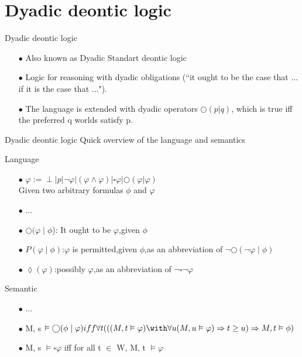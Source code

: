 \documentclass{beamer}
\begin{document}
\section{Dyadic deontic logic}
\begin{frame}{Dyadic deontic logic}
\begin{enumerate}
\item[$\bullet$]Also known as Dyadic Standart deontic logic
\item[$\bullet$]Logic for reasoning with dyadic obligations (“it ought to be the case that ... if it is the case that ...").
\item[$\bullet$]The language is extended with dyadic operators  $\bigcirc(p|q)$, which is true iff the preferred q worlds satisfy p.
\end{enumerate}
\end{frame}
\begin{frame}{Dyadic deontic logic}
Quick overview of the language and semantics
\begin{block}{Language}
\begin{enumerate}
\item[$\bullet$]$\varphi := \perp | p | \neg \varphi |(\varphi \wedge \varphi)|\square \varphi |\bigcirc(\varphi|\varphi)$\\
Given two arbitrary formulas $\phi$  and $\varphi$
\item[$\bullet$]...
\item[$\bullet$]$\bigcirc(\varphi\mid\phi$): It ought to be $\varphi$,given $\phi$\\
\item[$\bullet$]$P(\varphi\mid\phi) $:$\varphi$ is permitted,given $\phi$,as an abbreviation of $\neg\bigcirc(\neg\varphi\mid\phi)$\\
\item[$\bullet$]$\lozenge(\varphi)$:possibly $\varphi$,as an abbreviation of $\neg\square\neg\varphi$\\
\end{enumerate}
\end{block}
\begin{block}{Semantic}
\begin{enumerate}
\item[$\bullet$]...
\item[$\bullet$]M, s $ \vDash  \bigcirc(\phi\mid\varphi) iff \forall t(((M, t \vDash \varphi)\with\forall u(M, u \vDash \varphi) \Rightarrow t \geq u) \Rightarrow M, t \vDash \phi)$
\item[$\bullet$]M, s $ \vDash  \square\varphi$ iff for all t $\in$ W, M, t $\vDash \varphi$
\end{enumerate}
\end{block}

\end{frame}
\end{document}
